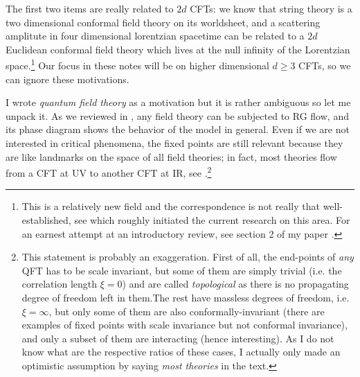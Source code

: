 The first two items are really related to $2d$ CFTs: we know that string theory is a two dimensional conformal field theory on its worldsheet, and a scattering amplitute in four dimensional lorentzian spacetime can be related to a $2d$ Euclidean conformal field theory which lives at the null infinity of the Lorentzian space.\footnote{
	This is a relatively new field and the correspondence is not really that well-established, see \cite{Pasterski:2016qvg} which roughly initiated the current research on this area. For an earnest attempt at an introductory review, see section 2 of my paper \cite{Albayrak:2020saa}.
} Our focus in these notes will be on higher dimensional $d\ge 3$ CFTs, so we can ignore these motivations.


I wrote \emph{quantum field theory} as a motivation but it is rather ambiguous so let me unpack it. As we reviewed in \secref{\ref{sec: review of RG}}, any field theory can be subjected to RG flow, and its phase diagram shows the behavior of the model in general. Even if we are not interested in critical phenomena, the fixed points are still relevant because they are like landmarks on the space of all field theories; in fact, most theories flow from a CFT at UV to another CFT at IR, see \figref{\ref{fig: UV completion}}.\footnote{This statement is probably an exaggeration. First of all, the end-points of \emph{any} QFT has to be scale invariant, but some of them are simply trivial (i.e. the correlation length $\xi=0$) and are called \emph{topological} as there is no propagating degree of freedom left in them.\footnotemark The rest have massless degrees of freedom, i.e. $\xi=\infty$, but only some of them are also conformally-invariant (there are examples of fixed points with scale invariance but not conformal invariance), and only a subset of them are interacting (hence interesting). As I do not know what are the respective ratios of these cases, I actually only made an optimistic assumption by saying \emph{most theories} in the text.}  

